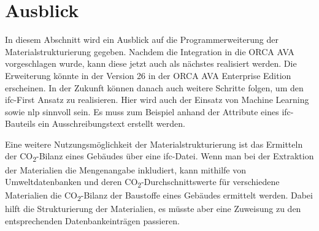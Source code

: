\section{Ausblick}
\label{c:closing:outlook}
In diesem Abschnitt wird ein Ausblick auf die Programmerweiterung der Materialstrukturierung gegeben. Nachdem die Integration in die ORCA AVA vorgeschlagen wurde, kann diese jetzt auch als nächstes realisiert werden. Die Erweiterung könnte in der Version 26 in der ORCA AVA Enterprise Edition erscheinen. In der Zukunft können danach auch weitere Schritte folgen, um den \ac{ifc}-First Ansatz zu realisieren. Hier wird auch der Einsatz von Machine Learning sowie \ac{nlp} sinnvoll sein. Es muss zum Beispiel anhand der Attribute eines \ac{ifc}-Bauteils ein Ausschreibungstext erstellt werden.

Eine weitere Nutzungsmöglichkeit der Materialstrukturierung ist das Ermitteln der CO\textsubscript{2}-Bilanz eines Gebäudes über eine \ac{ifc}-Datei. Wenn man bei der Extraktion der Materialien die Mengenangabe inkludiert, kann mithilfe von Umweltdatenbanken und deren CO\textsubscript{2}-Durchschnittswerte für verschiedene Materialien die CO\textsubscript{2}-Bilanz der Baustoffe eines Gebäudes ermittelt werden. Dabei hilft die Strukturierung der Materialien, es müsste aber eine Zuweisung zu den entsprechenden Datenbankeinträgen passieren. 
